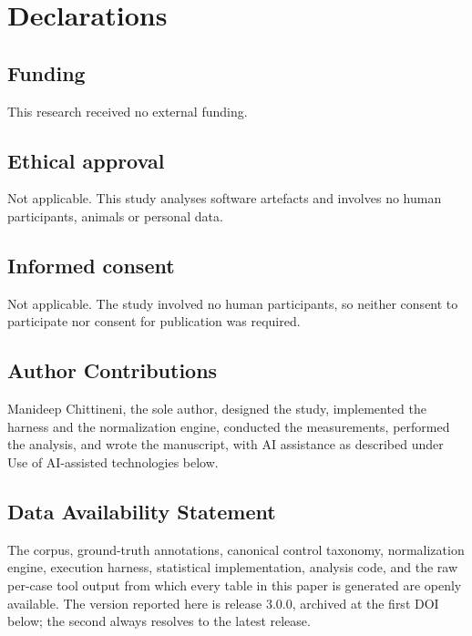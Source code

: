 \documentclass[smallextended]{svjour3}
\begin{document}
\section*{Declarations}

\subsection*{Funding}
This research received no external funding.

\subsection*{Ethical approval}
Not applicable. This study analyses software artefacts and involves no human
participants, animals or personal data.

\subsection*{Informed consent}
Not applicable. The study involved no human participants, so neither consent to
participate nor consent for publication was required.

\subsection*{Author Contributions}
Manideep Chittineni, the sole author, designed the study, implemented
the harness and the normalization engine, conducted the measurements, performed
the analysis, and wrote the manuscript, with AI assistance as described under Use
of AI-assisted technologies below.

\subsection*{Data Availability Statement}
The corpus, ground-truth annotations,
canonical control taxonomy, normalization engine, execution harness, statistical
implementation, analysis code, and the raw per-case tool output from which every
table in this paper is generated are openly available. The version reported here
is release 3.0.0, archived at the first DOI below; the second always resolves to
the latest release.
\end{document}
